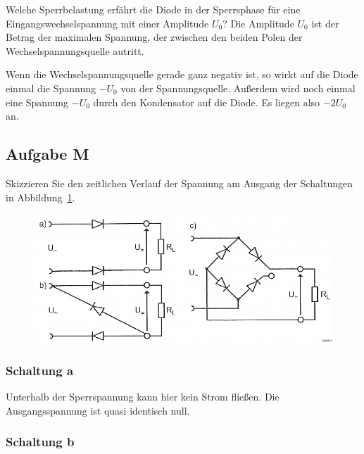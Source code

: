 \begin{problem}
	Welche Sperrbelastung erfährt die Diode in der Sperrsphase für eine
	Eingangswechselspannung mit einer Amplitude $U_0$? Die Amplitude $U_0$ ist
	der Betrag der maximalen Spannung, der zwischen den beiden Polen der
	Wechselspannungsquelle autritt.
\end{problem}

Wenn die Wechselspannungsquelle gerade ganz negativ ist, so wirkt auf die Diode
einmal die Spannung $- U_0$ von der Spannungsquelle. Außerdem wird noch einmal
eine Spannung $-U_0$ durch den Kondensator auf die Diode. Es liegen also
$-2U_0$ an.

\FloatBarrier
\subsection{Aufgabe M}

\begin{problem}
	Skizzieren Sie den zeitlichen Verlauf der Spannung am Ausgang der
	Schaltungen in Abbildung~\ref{fig:2-9}.
\end{problem}

\begin{figure}[htbp]
	\centering
	\caption{%
		\cite[Abbildung~2.9]{physik313-Anleitung}
	}
	\label{fig:2-9}
	\includegraphics[width=\linewidth]{Bilder_aus_Anleitung/2-9.png}
\end{figure}

\subsubsection{Schaltung a}

Unterhalb der Sperrspannung kann hier kein Strom fließen. Die Ausgangsspannung
ist quasi identisch null.

\subsubsection{Schaltung b}

